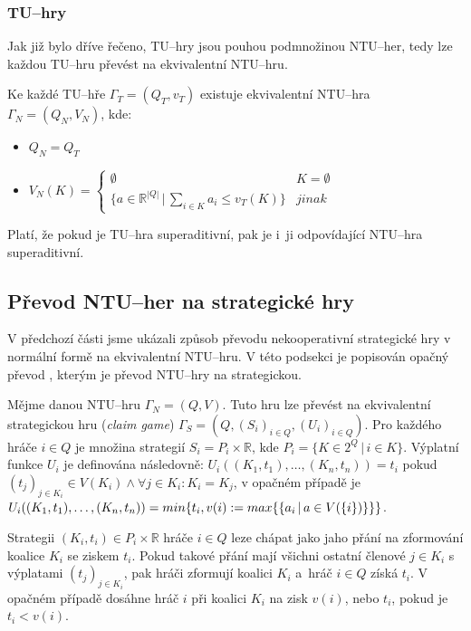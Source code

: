         \subsubsection*{TU--hry}
            Jak již bylo dříve řečeno, TU--hry jsou pouhou podmnožinou NTU--her, tedy lze každou TU--hru převést na ekvivalentní NTU--hru.

            Ke každé TU--hře $\Gamma_T = (Q_T, v_T)$ existuje ekvivalentní NTU--hra $\Gamma_N = (Q_N, V_N)$, kde:

            \vspace*{-0.3em}
            \begin{itemize}
                \item $Q_N = Q_T$
                \item $V_N(K) = \begin{cases}
                            \emptyset & K = \emptyset\\
                            \{a \in \mathbb{R}^{|Q|}\,|\, \sum_{i\in K} a_i \leq v_T(K)\} &jinak
                        \end{cases}
                        $
            \end{itemize}

            Platí, že pokud je TU--hra superaditivní, pak je i~ji odpovídající NTU--hra superaditivní.

    \subsection{Převod NTU--her na strategické hry}
        V předchozí části jsme ukázali způsob převodu nekooperativní strategické hry v normální formě na ekvivalentní NTU--hru. V této podsekci je popisován opačný převod \cite{NTU2STR}, kterým je převod NTU--hry na strategickou.

        Mějme danou NTU--hru $\Gamma_N = (Q, V)$. Tuto hru lze převést na ekvivalentní strategickou hru (\textit{claim game}) $\Gamma_S = (Q, (S_i)_{i\in Q}, (U_i)_{i \in Q})$. Pro každého hráče $i \in Q$ je množina strategií $S_i = P_i \times \mathbb{R}$, kde $P_i = \{K \in 2^Q\,|\, i \in K\}$. Výplatní funkce $U_i$ je definována následovně: $U_i((K_1, t_1), \dots, (K_n, t_n)) = t_i$ pokud $(t_j)_{j\in K_i} \in V(K_i) \land \forall j \in K_i: K_i = K_j$, v opačném případě je $U_i((K_1, t_1), \dots,\\ (K_n, t_n)) = min\{t_i, v(i) := max\{\{a_i\,|\, a \in V(\{i\})\}\}\}$.

        Strategii $(K_i, t_i) \in P_i \times \mathbb{R}$ hráče $i \in Q$ leze chápat jako jaho přání na zformování koalice $K_i$ se ziskem $t_i$. Pokud takové přání mají všichni ostatní členové $j \in K_i$ s výplatami $(t_j)_{j\in K_i}$, pak hráči zformují koalici $K_i$ a~hráč $i \in Q$ získá $t_i$. V opačném případě dosáhne hráč $i$ při koalici $K_i$ na zisk $v(i)$, nebo $t_i$, pokud je $t_i < v(i)$.

